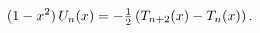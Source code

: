 \[(1-x^{2})\mathop{U_{n}\/}\nolimits\!\left(x\right)=-\tfrac{1}{2}\left(\mathop{%
T_{n+2}\/}\nolimits\!\left(x\right)-\mathop{T_{n}\/}\nolimits\!\left(x\right)%
\right).\]